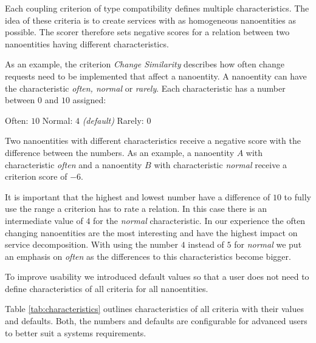 Each coupling criterion of type compatibility defines multiple characteristics. The idea of these criteria is to create services with as homogeneous nanoentities as possible. The scorer therefore sets negative scores for a relation between two nanoentities having different characteristics. 

As an example, the criterion \textit{Change Similarity} describes how often change requests need to be implemented that affect a nanoentity. A nanoentity can have the characteristic \textit{often, normal} or \textit{rarely}. Each characteristic has a number between $0$ and $10$ assigned:

Often: $10$ \newline
Normal: $4$ \textit{(default)} \newline
Rarely: $0$ \newline

Two nanoentities with different characteristics receive a negative score with the difference between the numbers. As an example, a nanoentity $A$ with characteristic \textit{often} and a nanoentity $B$ with characteristic \textit{normal} receive a criterion score of $-6$. 

It is important that the highest and lowest number have a difference of $10$ to fully use the range a criterion has to rate a relation. \newline In this case there is an intermediate value of $4$ for the \textit{normal} characteristic. In our experience the often changing nanoentities are the most interesting and have the highest impact on service decomposition. With using the number $4$ instead of $5$ for \textit{normal} we put an emphasis on \textit{often} as the differences to this characteristics become bigger. 

To improve usability we introduced default values so that a user does not need to define characteristics of all criteria for all nanoentities. 

Table \ref{tab:characteristics} outlines characteristics of all criteria with their values and defaults. Both, the numbers and defaults are configurable for advanced users to better suit a systems requirements. 


